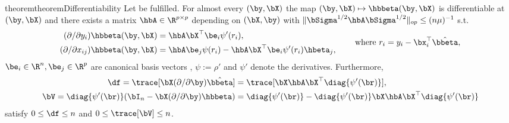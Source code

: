 \documentclass{colt2022} %
\numberwithin{equation}{section}
\begin{document}
\begin{restatable}{theorem}{theoremDifferentiability}
    \label{thm:differentiability}
    Let  be fulfilled.
    For almost every $(\by,\bX)$ the map $(\by,\bX)\mapsto \hbbeta(\by,\bX)$
    is differentiable at $(\by,\bX)$ and there exists a matrix $\hbA\in\R^{p\times p}$
    depending on $(\bX, \by)$
    with $\|\bSigma^{1/2}\hbA\bSigma^{1/2}\|_{op} \le (n\mu)^{-1}$
    s.t.
    \begin{equation}
        \begin{split}
        (\partial/\partial y_i)
        \hbbeta(\by,\bX)
        &=  \hbA \bX^\top \be_i\psi'(r_i), 
        \\
        (\partial/\partial x_{ij})
        \hbbeta(\by,\bX)
        &=   \hbA \be_j \psi(r_i)
        - \hbA \bX^\top \be_i \psi'(r_i)  \hbeta_j,
        \end{split}
        \qquad
        \text{ where }
        r_i = y_{i} - \bx_{i}^{\top} \hat \bbeta,
        \label{eq:differentiability-formulae}
    \end{equation}
    $\be_i\in\R^n, \be_j\in\R^p$ are canonical basis vectors
    , $\psi := \rho'$ and $\psi'$ denote the derivatives.
    Furthermore,
\begin{align}
    \df = \trace [ \bX ( \partial / \partial \by ) \hat\bbeta ]
        &= \trace[\bX\hbA\bX^{\top}\diag\{\psi'(\br)\}],
        \label{df}
    \\
    \bV =  \diag\{\psi'(\br)\} (\bI_n - \bX(\partial/\partial \by)\hbbeta)
        &=
        \diag\{\psi'(\br)\} - \diag\{\psi'(\br)\}\bX\hbA\bX^{\top}\diag\{\psi'(\br)\}
        \label{V}
\end{align}
    satisfy $0\le\df\le n$
    and $0\le \trace[\bV] \le n$.

\end{restatable}
\end{document}
